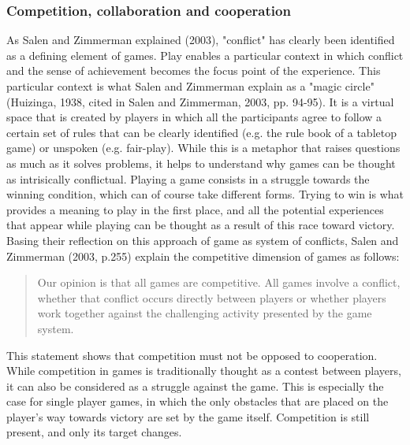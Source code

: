 \subsubsection{Competition, collaboration and cooperation}
As Salen and Zimmerman explained (2003)\cite{book:rop}, "conflict" has clearly been identified as a defining element of games. Play enables a particular context in which conflict and the sense of achievement becomes the focus point of the experience. This particular context is what Salen and Zimmerman explain as a "magic circle" (Huizinga, 1938, cited in Salen and Zimmerman, 2003, pp. 94-95)\cite{book:rop}. It is a virtual space that is created by players in which all the participants agree to follow a certain set of rules that can be clearly identified (e.g. the rule book of a tabletop game) or unspoken (e.g. fair-play). While this is a metaphor that raises questions as much as it solves problems, it helps to understand why games can be thought as intrisically conflictual. Playing a game consists in a struggle towards the winning condition, which can of course take different forms. Trying to win is what provides a meaning to play in the first place, and all the potential experiences that appear while playing can be thought as a result of this race toward victory. Basing their reflection on this approach of game as system of conflicts, Salen and Zimmerman (2003, p.255)\cite{book:rop} explain the competitive dimension of games as follows:
\begin{quotation}
Our opinion is that all games are competitive. All games involve a conflict, whether that conflict occurs directly between players or whether players work together against the challenging activity presented by the game system.
\end{quotation}
This statement shows that competition must not be opposed to cooperation. While competition in games is traditionally  thought as a contest between players, it can also be considered as a struggle against the game. This is especially the case for single player games, in which the only obstacles that are placed on the player's way towards victory are set by the game itself. Competition is still present, and only its target changes. 

